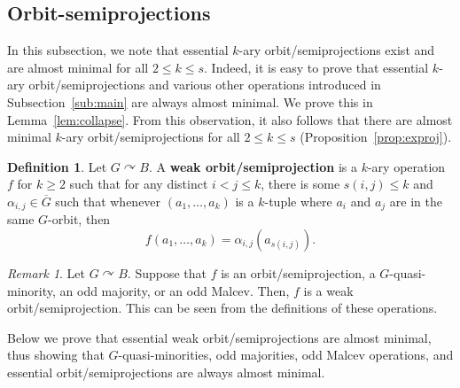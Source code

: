 \documentclass{article}
\theoremstyle{remark}
\newtheorem{remark}[theorem]{Remark}
\theoremstyle{definition}
\newtheorem{definition}[theorem]{Definition}
\def\acts{\curvearrowright}
\begin{document}
\subsection{Orbit-semiprojections} \label{sub:exminorb}
In this subsection, we note that essential $k$-ary orbit\-/semiprojections exist and are almost minimal for all $2\leq k\leq s$. Indeed, it is easy to prove that essential $k$-ary orbit\-/semiprojections and various other operations introduced in Subsection~\ref{sub:main} are always almost minimal. We prove this in Lemma~\ref{lem:collapse}. From this observation, it also follows that there are almost minimal $k$-ary orbit\-/semiprojections for all $2\leq k\leq s$ (Proposition~\ref{prop:exproj}). 


\begin{definition} Let $G\acts B$. A \textbf{weak orbit\-/semiprojection} is a $k$-ary operation $f$ for $k\geq 2$ such that for any distinct $ i<j\leq k$, there is some $s(i,j)\leq k$ and $\alpha_{i,j}\in \overline{G}$ such that whenever $(a_1, \dots, a_k)$ is a $k$-tuple where $a_i$ and $a_j$ are in the same $G$-orbit, then 
\[f(a_1, \dots, a_k)=\alpha_{i,j}(a_{s(i,j)}).\]
\end{definition}

\begin{remark}\label{allweak} Let $G\acts B$. Suppose that $f$ is an orbit\-/semiprojection, a $G$-quasi-minority, an odd majority, or an odd Malcev. Then, $f$ is a weak orbit\-/semiprojection. This can be seen from the definitions of these operations.
\end{remark}

Below we prove that essential weak orbit\-/semiprojections are almost minimal, thus showing that $G$-quasi-minorities, odd majorities, odd Malcev operations, and essential orbit\-/semiprojections are always almost minimal. 
\end{document}
